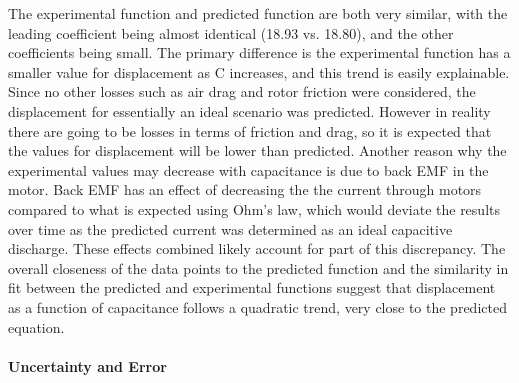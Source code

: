 \documentclass[12pt,letterpaper]{article}
\begin{document}
The experimental function and predicted function are both very similar, with the leading coefficient being almost identical (18.93 vs. 18.80), and the other coefficients being small. The primary difference is the experimental function has a smaller value for displacement as C increases, and this trend is easily explainable. Since no other losses such as air drag and rotor friction were considered, the displacement for essentially an ideal scenario was predicted. However in reality there are going to be losses in terms of friction and drag, so it is expected that the values for displacement will be lower than predicted. Another reason why the experimental values may decrease with capacitance is due to back EMF in the motor. Back EMF has an effect of decreasing the the current through motors compared to what is expected using Ohm's law, which would deviate the results over time as the predicted current was determined as an ideal capacitive discharge. These effects combined likely account for part of this discrepancy. The overall closeness of the data points to the predicted function and the similarity in fit between the predicted and experimental functions suggest that displacement as a function of capacitance follows a quadratic trend, very close to the predicted equation. \\\\
%
\textbf{Uncertainty and Error}
\newline
\end{document}
